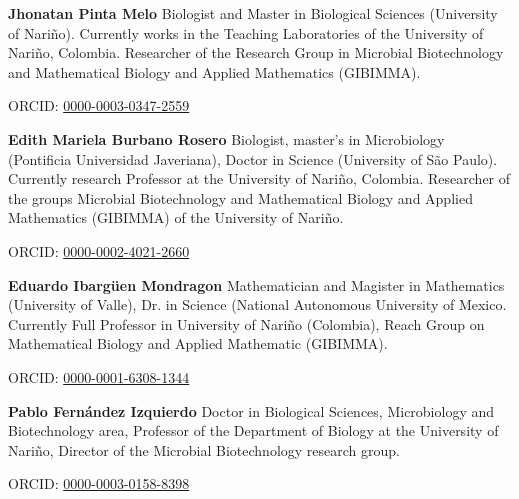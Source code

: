 \documentclass{univsciauth}
\begin{document}
\vspace{2mm}
\begin{shaded*}
        {\fontsize{11}{10}\selectfont\textbf{\textcolor{myseccolor}{Jhonatan Pinta Melo}}}
        Biologist and Master in Biological Sciences (University of Nariño). Currently works in the Teaching
        Laboratories of the University of Nariño, Colombia. Researcher of the Research Group in Microbial
        Biotechnology and Mathematical Biology and Applied Mathematics (GIBIMMA).

        ORCID: \href{https://orcid.org/0000-0003-0347-2559}{0000-0003-0347-2559}
\end{shaded*}
\vspace{2mm}
\begin{shaded*}
        {\fontsize{11}{10}\selectfont\textbf{\textcolor{myseccolor}{Edith Mariela Burbano Rosero}}}
        Biologist, master's in Microbiology (Pontificia Universidad Javeriana), Doctor in Science (University
        of São Paulo). Currently research Professor at the University of Nariño, Colombia. Researcher of
        the groups Microbial Biotechnology and Mathematical Biology and Applied Mathematics
        (GIBIMMA) of the University of Nariño. 

        ORCID: \href{https://orcid.org/0000-0002-4021-2660}{0000-0002-4021-2660}
\end{shaded*}
\vspace{2mm}
\begin{shaded*}
        {\fontsize{11}{10}\selectfont\textbf{\textcolor{myseccolor}{Eduardo Ibargüen Mondragon}}}
        Mathematician and Magister in Mathematics (University of Valle), Dr. in Science (National
        Autonomous University of Mexico. Currently Full Professor in University of Nariño (Colombia),
        Reach Group on Mathematical Biology and Applied Mathematic (GIBIMMA).

        ORCID: \href{https://orcid.org/0000-0001-6308-1344}{0000-0001-6308-1344}
\end{shaded*}
\vspace{2mm}
\begin{shaded*}
        {\fontsize{11}{10}\selectfont\textbf{\textcolor{myseccolor}{Pablo Fernández Izquierdo}}}
        Doctor in Biological Sciences, Microbiology and Biotechnology area, Professor of the Department
        of Biology at the University of Nariño, Director of the Microbial Biotechnology research group.

        ORCID: \href{https://orcid.org/0000-0003-0158-8398}{0000-0003-0158-8398}
\end{shaded*}
\end{document}
